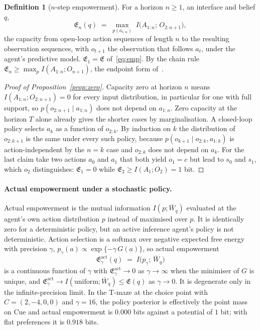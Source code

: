 \documentclass[letterpaper]{article} %
\theoremstyle{definition}
\newtheorem{definition}{Definition}
\providecommand{\Emp}{\mathfrak{E}}
\begin{document}
\begin{definition}[$n$-step empowerment]
For a horizon $n \ge 1$, an interface and belief $q$,
\begin{equation}
  \Emp_n(q) \;=\; \max_{p(a_{1:n})}\; I\big(A_{1:n};\, O_{2:n+1}\big),
\end{equation}
the capacity from open-loop action sequences of length $n$ to the resulting observation sequences, with $o_{t+1}$ the observation that follows $a_t$, under the agent's predictive model. $\Emp_1 = \Emp$ of~\eqref{eq:emp}. By the chain rule $\Emp_n \ge \max_p I(A_{1:n}; O_{n+1})$, the endpoint form of~\citet{Klyubin2005empowerment}.
\end{definition}

\begin{proof}[Proof of Proposition~\ref{prop:zero}]
Capacity zero at horizon $n$ means $I(A_{1:n}; O_{2:n+1}) = 0$ for every input distribution, in particular for one with full support, so $p(o_{2:n+1} \mid a_{1:n})$ does not depend on $a_{1:n}$. Zero capacity at the horizon $T$ alone already gives the shorter cases by marginalisation. A closed-loop policy selects $a_k$ as a function of $o_{2:k}$. By induction on $k$ the distribution of $o_{2:k+1}$ is the same under every such policy, because $p(o_{k+1} \mid o_{2:k}, a_{1:k})$ is action-independent by the $n = k$ case and $o_{2:k}$ does not depend on $a_k$. For the last claim take two actions $a_0$ and $a_1$ that both yield $o_1 = c$ but lead to $s_0$ and $s_1$, which $o_2$ distinguishes: $\Emp_1 = 0$ while $\Emp_2 \ge I(A_1; O_2) = 1$ bit.
\end{proof}

\paragraph{Actual empowerment under a stochastic policy.}
Actual empowerment is the mutual information $I(p; \bar W_q)$ evaluated at the agent's own action distribution $p$ instead of maximised over $p$. It is identically zero for a deterministic policy, but an active inference agent's policy is not deterministic. Action selection is a softmax over negative expected free energy with precision $\gamma$, $p_\gamma(a) \propto \exp\{-\gamma\, G(a)\}$, so actual empowerment
\begin{equation}
  \Emp^{\mathrm{act}}_\gamma(q) \;=\; I\big(p_\gamma;\, \bar W_q\big)
\end{equation}
is a continuous function of $\gamma$ with $\Emp^{\mathrm{act}}_\gamma \to 0$ as $\gamma \to \infty$ when the minimiser of $G$ is unique, and $\Emp^{\mathrm{act}}_\gamma \to I(\text{uniform}; \bar W_q) \le \Emp(q)$ as $\gamma \to 0$. It is degenerate only in the infinite-precision limit. In the T-maze at the choice point with $C = (2, -4, 0, 0)$ and $\gamma = 16$, the policy posterior is effectively the point mass on Cue and actual empowerment is $0.000$ bits against a potential of $1$ bit; with flat preferences it is $0.918$ bits.
\end{document}
